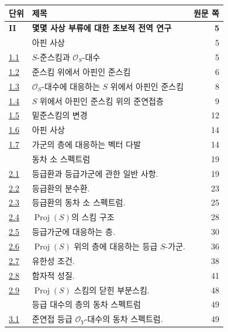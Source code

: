 \begingroup
\small
\renewcommand{\arraystretch}{1.04}
\begin{longtable}{@{}p{}p{}r@{}}
\textbf{단위} & \textbf{제목} & \textbf{원문 쪽}\\
\hline
\textbf{II} & \textbf{몇몇 사상 부류에 대한 초보적 전역 연구} & \textbf{5}\\
\hyperref[section:II.1-ko]{\textsection1} & 아핀 사상 & 5\\
\hyperref[subsection:II.1.1-ko]{1.1} & $S$-준스킴과 $\mathcal{O}_S$-대수 & 5\\
\hyperref[subsection:II.1.2-ko]{1.2} & 준스킴 위에서 아핀인 준스킴 & 6\\
\hyperref[subsection:II.1.3-ko]{1.3} & $\mathcal{O}_S$-대수에 대응하는 $S$ 위에서 아핀인 준스킴 & 8\\
\hyperref[subsection:II.1.4-ko]{1.4} & $S$ 위에서 아핀인 준스킴 위의 준연접층 & 9\\
\hyperref[II.1.5-ko]{1.5} & 밑준스킴의 변경 & 12\\
\hyperref[II.1.6-ko]{1.6} & 아핀 사상 & 14\\
\hyperref[II.1.7-ko]{1.7} & 가군의 층에 대응하는 벡터 다발 & 14\\
\hyperref[section:II.2-ko]{\textsection2} & 동차 소 스펙트럼 & 19\\
\hyperref[subsection:II.2.1-ko]{2.1} & 등급환과 등급가군에 관한 일반 사항. & 19\\
\hyperref[subsection:II.2.2-ko]{2.2} & 등급환의 분수환. & 23\\
\hyperref[subsection:II.2.3-ko]{2.3} & 등급환의 동차 소 스펙트럼. & 25\\
\hyperref[subsection:II.2.4-ko]{2.4} & $\operatorname{Proj}(S)$의 스킴 구조 & 28\\
\hyperref[subsection:II.2.5-ko]{2.5} & 등급가군에 대응하는 층. & 30\\
\hyperref[subsection:II.2.6-ko]{2.6} & $\operatorname{Proj}(S)$ 위의 층에 대응하는 등급 $S$-가군. & 36\\
\hyperref[subsection:II.2.7-ko]{2.7} & 유한성 조건. & 38\\
\hyperref[subsection:II.2.8-ko]{2.8} & 함자적 성질. & 41\\
\hyperref[subsection:II.2.9-ko]{2.9} & $\operatorname{Proj}(S)$ 스킴의 닫힌 부분스킴. & 48\\
\hyperref[section:II.3-ko]{\textsection3} & 등급 대수의 층의 동차 스펙트럼 & 49\\
\hyperref[subsection:II.3.1-ko]{3.1} & 준연접 등급 $\mathcal{O}_Y$-대수의 동차 스펙트럼. & 49\\

\end{longtable}
